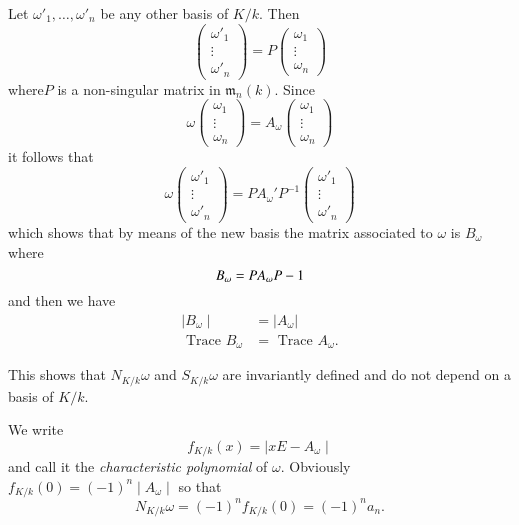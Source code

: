  Let $ \omega'_1 , \ldots , \omega'_n $ be any other basis of  $ K/ k
 $. Then  
 $$
 \begin{pmatrix} \omega'_1 \\ \vdots \\ \omega'_n\end{pmatrix} =
   P \begin{pmatrix} \omega_1 \\ \vdots \\ \omega_n\end{pmatrix} 
 $$ 
 where\pageoriginale  $P$ is a non-singular matrix in $ \mathfrak{m}_n
 (k) $. Since   
 $$
 \omega \begin{pmatrix} \omega_1 \\ \vdots \\ \omega_n\end{pmatrix} =
   A_\omega \begin{pmatrix} \omega_1 \\ \vdots
     \\ \omega_n\end{pmatrix} 
 $$ 
 it follows that  
 $$
  \omega  \begin{pmatrix} \omega'_1 \\ \vdots
    \\ \omega'_n\end{pmatrix} =  P A_\omega' P^{-1}  \begin{pmatrix}
      \omega'_1 \\ \vdots \\ \omega'_n \end{pmatrix} 
 $$ 
  which shows  that by means of the new basis the matrix associated to
  $ \omega $ is $ B_\omega $ where 
  $$
  B_\omega =  P A_\omega P-1 \\
  $$  
  and then we have 
  \begin{align*}
  \mid B_\omega \mid &= \left| A_\omega \right| \\
  \text{ Trace } B_\omega &= \text{ Trace } A_\omega .
  \end{align*}
  
  This shows that $ N_{K/k} \omega $  and $ S_{K/k} \omega $ are
  invariantly defined and do not depend on a basis of $ K/k $. 
  
  We write 
  $$
  f_{K/k} (x)  = \mid x E - A_\omega \mid 
  $$
  and call it the \textit{characteristic polynomial} of $ \omega 
  $. Obviously  $ f_{K/k} (0) = (-1)^n \mid A_\omega \mid $ so that  
  \begin{equation*}
N_{K/k}  \omega = (-1)^n  f_{K/k}  (0) = (-1)^n a_n . \tag{1}\label{c4:eq1}  
  \end{equation*}  
  

